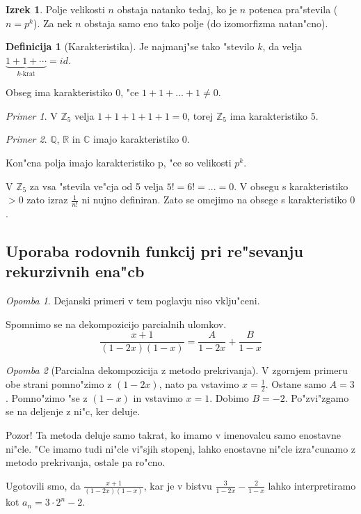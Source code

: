 \documentclass[a4paper,12pt]{article}
\theoremstyle{definition}
\newtheorem{defn}[counter]{Definicija}
\newtheorem{theorem}[counter]{Izrek}
\theoremstyle{remark}
\newtheorem*{ex}{Primer}
\newtheorem*{rem}{Opomba}
\newcommand{\Z}{\mathbb{Z}}
\newcommand{\Q}{\mathbb{Q}}
\newcommand{\R}{\mathbb{R}}
\newcommand{\C}{\mathbb{C}}
\begin{document}
\begin{theorem}
    Polje velikosti $n$ obstaja natanko tedaj, ko je $n$ potenca pra"stevila ($n = p^k$). Za nek $n$ obstaja samo eno tako polje (do izomorfizma natan"cno).
\end{theorem}

\begin{defn}[Karakteristika]
	Je najmanj"se tako "stevilo $k$, da velja $\underbrace{1 + 1 + \cdots}_{k\text{-krat}} = id$.

	Obseg ima karakteristiko $0$, "ce $1 + 1 + ... + 1 \neq 0$.
\end{defn}
\begin{ex}
	V $\Z_5$ velja $1 + 1 + 1 + 1 + 1 = 0$, torej $\Z_5$ ima karakteristiko $5$.
\end{ex}
\begin{ex}
	$\Q$, $\R$ in $\C$ imajo karakteristiko $0$.
\end{ex}
Kon"cna polja imajo karakteristiko p, "ce so velikosti $p^k$.

V $\Z_5$ za vsa "stevila ve"cja od 5 velja $5! = 6! = ... = 0$.
V obsegu s karakteristiko $> 0$ zato izraz $\frac{1}{n!}$ ni nujno definiran. Zato se omejimo na obsege s karakteristiko $0$.

\subsection{Uporaba rodovnih funkcij pri re"sevanju rekurzivnih ena"cb}
\begin{rem}
	Dejanski primeri v tem poglavju niso vklju"ceni.
	\label{TODO: zakaj ne? A so stupid, al jih mormo se dodat?}
\end{rem}

Spomnimo se na dekompozicijo parcialnih ulomkov.
\[\frac{x + 1}{(1-2x)(1-x)} = \frac{A}{1-2x} + \frac{B}{1-x}\]

\begin{rem}[Parcialna dekompozicija z metodo prekrivanja]
	V zgornjem primeru obe strani pomno"zimo z $(1 - 2x)$, nato pa vstavimo $x = \frac{1}{2}$. Ostane samo $A = 3$. Pomno"zimo "se z $(1 - x)$ in vstavimo $x = 1$. Dobimo $B = -2$. Po"zvi"zgamo se na deljenje z ni"c, ker deluje.

	Pozor! Ta metoda deluje samo takrat, ko imamo v imenovalcu samo enostavne ni"cle. "Ce imamo tudi ni"cle vi"sjih stopenj, lahko enostavne ni"cle izra"cunamo z metodo prekrivanja, ostale pa ro"cno.
\end{rem}

Ugotovili smo, da $\frac{x + 1}{(1-2x)(1-x)}$, kar je v bistvu $\frac{3}{1 - 2x} - \frac{2}{1 - x}$ lahko interpretiramo kot $a_n = 3 \cdot 2^n - 2$.
\end{document}
